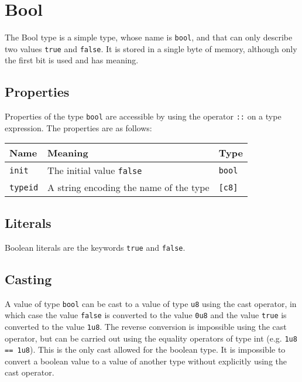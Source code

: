 \section{Bool}
\label{sec:org9f3a743}

The Bool type is a simple type, whose name is \texttt{bool}, and that can only
describe two values \texttt{true} and \texttt{false}. It is stored in a single
byte of memory, although only the first bit is used and has meaning.

\subsection{Properties}
\label{sec:org503bc9e}

Properties of the type \texttt{bool} are accessible by using the operator
\texttt{::} on a type expression. The properties are as follows:

\begin{center}
  \vspace{-5pt}
  \begin{adjustbox}{max width=\linewidth}
    \begin{tabular}{|l|ll|}
      \hline
      Name & Meaning & Type\\[0pt]
      \hline
      \hline
      \texttt{init} & The initial value \texttt{false} & \texttt{bool}\\[0pt]
      \hline
      \texttt{typeid} & A string encoding the name of the type & \texttt{[c8]}\\[0pt]
      \hline
    \end{tabular}
  \end{adjustbox}
\end{center}

\subsection{Literals}
\label{sec:org7620b9c}

Boolean literals are the keywords \texttt{true} and \texttt{false}.

\subsection{Casting}
\label{sec:org7cd1f94}

A value of type \texttt{bool} can be cast to a value of type \texttt{u8} using
the cast operator, in which case the value \texttt{false} is converted to the
value \texttt{0u8} and the value \texttt{true} is converted to the value
\texttt{1u8}. The reverse conversion is impossible using the cast operator, but
can be carried out using the equality operators of type int (e.g. \texttt{1u8 ==
  1u8}). This is the only cast allowed for the boolean type. It is impossible to
convert a boolean value to a value of another type without explicitly using the
cast operator.


